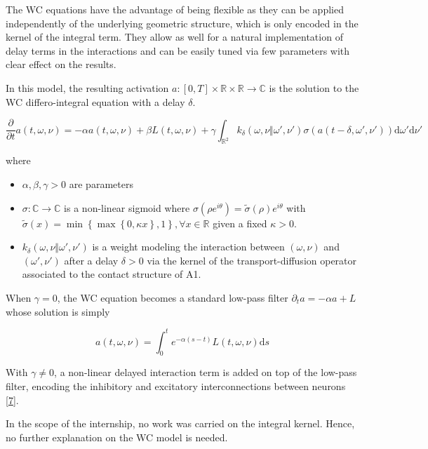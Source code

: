 \documentclass[
  american,
]{article}
\providecommand{\tightlist}{%
  \setlength{\itemsep}{0pt}\setlength{\parskip}{0pt}}
\begin{document}
The WC equations have the advantage of being flexible as they can be applied independently
of the underlying geometric structure, which is only encoded in the kernel of the integral term.
They allow as well for a natural implementation of delay terms in the interactions
and can be easily tuned via few parameters with clear effect on the results.

In this model, the resulting activation \(a:[0,T]\times\mathbb{R}\times\mathbb{R}\rightarrow\mathbb{C}\) is the solution
to the WC differo-integral equation with a delay \(\delta\).

\begin{equation}
\frac{\partial}{\partial t}a(t,\omega,\nu) = -\alpha a(t,\omega,\nu) + \beta L(t,\omega,\nu)
+ \gamma\int_{\mathbb{R}^2} k_\delta(\omega,\nu\Vert\omega',\nu') \sigma(a(t-\delta,\omega',\nu')) \mathrm{d}\omega'\mathrm{d}\nu'
\end{equation}

where

\begin{itemize}
\tightlist
\item
  \(\alpha,\beta,\gamma>0\) are parameters
\item
  \(\sigma:\mathbb{C}\rightarrow\mathbb{C}\) is a non-linear sigmoid where \(\sigma(\rho e^{i\theta})=\tilde\sigma(\rho)e^{i\theta}\)
  with \(\tilde\sigma(x)=\min\left\{\max\left\{0,\kappa x\right\}, 1\right\},\forall x\in\mathbb{R}\) given a fixed \(\kappa>0\).
\item
  \(k_\delta(\omega,\nu\Vert\omega',\nu')\) is a weight modeling the interaction
  between \((\omega,\nu)\) and \((\omega',\nu')\) after a delay \(\delta>0\) via the kernel of the transport-diffusion
  operator associated to the contact structure of A1.
\end{itemize}

When \(\gamma=0\), the WC equation becomes a standard low-pass filter \(\partial_t a=-\alpha a + L\)
whose solution is simply

\begin{equation}
a(t,\omega,\nu) = \int_0^t e^{-\alpha(s-t)}L(t,\omega,\nu)\mathrm{d}s
\end{equation}

With \(\gamma\neq0\), a non-linear delayed interaction term is added on top
of the low-pass filter, encoding the inhibitory and excitatory interconnections between neurons {[}\protect\hyperlink{ref-boscain2021}{7}{]}.

In the scope of the internship, no work was carried on the integral kernel.
Hence, no further explanation on the WC model is needed.
\end{document}
